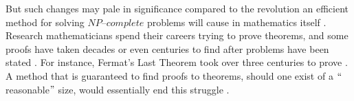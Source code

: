 \documentclass[a4paper,UKenglish,cleveref, autoref]{lipics-v2019}
\begin{document}
But such changes may pale in significance compared to the revolution an efficient method for solving $\textit{NP--complete}$ problems will cause in mathematics itself \cite{CS00}. Research mathematicians spend their careers trying to prove theorems, and some proofs have taken decades or even centuries to find after problems have been stated \cite{AS17}. For instance, Fermat's Last Theorem took over three centuries to prove \cite{AS17}. A method that is guaranteed to find proofs to theorems, should one exist of a $``$reasonable$"$ size, would essentially end this struggle \cite{CS00}.



\end{document}
